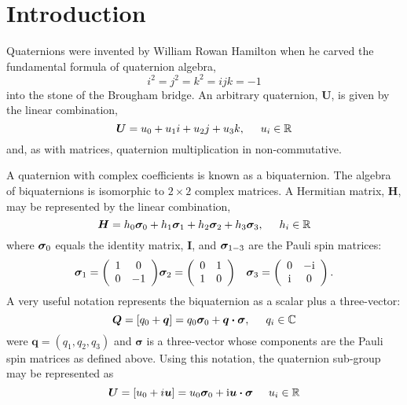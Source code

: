 \documentclass[12pt]{article}
\newcommand{\Ci}{{\rm i}}
\newcommand{\C}{\mathbb{C}}
\newcommand{\R}{\mathbb{R}}
\newcommand{\pauli}[1]{\ensuremath{ {\bm\sigma}_{\rm #1} }}
\begin{document}
\section{Introduction}

Quaternions were invented by William Rowan Hamilton when he carved the
fundamental formula of quaternion algebra,
\begin{equation}
i^2=j^2=k^2=ijk=-1
\end{equation}
into the stone of the Brougham bridge.
An arbitrary quaternion, $\bm{U}$, is given by the linear combination,
\begin{equation}
\bm{U}=u_0+u_1i+u_2j+u_3k, \hspace{5mm} u_i\in\R
\end{equation}
and, as with matrices, quaternion multiplication in non-commutative.

A quaternion with complex coefficients is known as a biquaternion.
The algebra of biquaternions is isomorphic to $2\times2$ complex
matrices.  A Hermitian matrix, $\bm{H}$, may be represented by the
linear combination,
\begin{equation}
\bm{H}=h_0\pauli{0}+h_1\pauli{1}+h_2\pauli{2}+h_3\pauli{3},\hspace{5mm}h_i\in\R
\end{equation}
where $\pauli{0}$ equals the identity matrix, $\bm{I}$, and $\pauli{1-3}$
are the Pauli spin matrices:
\begin{eqnarray}
\pauli{1} = \left( \begin{array}{cc}
1 & 0 \\
0 & -1 
\end{array}\right)
&
\pauli{2} = \left( \begin{array}{cc}
0 & 1 \\
1 & 0 
\end{array}\right)
& 
\pauli{3} = \left( \begin{array}{cc}
0 & -\Ci \\
\Ci & 0
\end{array}\right).
\label{eqn:pauli}
\end{eqnarray}
A very useful notation represents the biquaternion as a scalar plus
a three-vector:
\begin{equation}\label{eqn:biquaternion}
\bm{Q}=[q_0+\bm{q}] = q_0\pauli{0} + \bm{q\cdot\sigma}, \hspace{5mm} q_i\in\C
\end{equation}
were $\bm{q}=(q_1,q_2,q_3)$ and $\bm\sigma$ is a three-vector whose
components are the Pauli spin matrices as defined above.
Using this notation, the quaternion sub-group may be represented as
\begin{equation}\label{eqn:quaternion}
\bm{U}=[u_0+i\bm{u}]= u_0\pauli{0} + \Ci\bm{u\cdot\sigma} \hspace{5mm} u_i\in\R
\end{equation}
\end{document}
